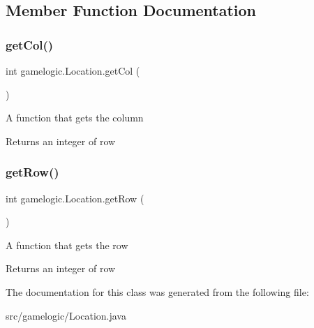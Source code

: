 \subsection{Member Function Documentation}
\mbox{\label{classgamelogic_1_1_location_aea6fd7274810050fc0d2b46805c85d6f}} 
\subsubsection{\texorpdfstring{get\+Col()}{getCol()}}
{\footnotesize\ttfamily int gamelogic.\+Location.\+get\+Col (\begin{DoxyParamCaption}{ }\end{DoxyParamCaption})}

A function that gets the column \begin{DoxyReturn}{Returns}
an integer of row 
\end{DoxyReturn}
\mbox{\label{classgamelogic_1_1_location_a2f7ffddb0a19205378c67bc745bedc83}} 
\subsubsection{\texorpdfstring{get\+Row()}{getRow()}}
{\footnotesize\ttfamily int gamelogic.\+Location.\+get\+Row (\begin{DoxyParamCaption}{ }\end{DoxyParamCaption})}

A function that gets the row \begin{DoxyReturn}{Returns}
an integer of row 
\end{DoxyReturn}


The documentation for this class was generated from the following file\+:\begin{DoxyCompactItemize}
\item 
src/gamelogic/Location.\+java\end{DoxyCompactItemize}
